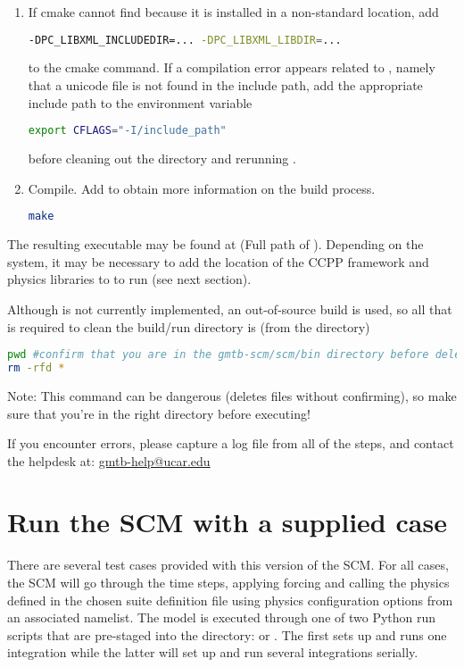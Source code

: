\begin{enumerate}
       \item If cmake cannot find  because it is installed in a non-standard location, add
\begin{lstlisting}[language=bash]
-DPC_LIBXML_INCLUDEDIR=... -DPC_LIBXML_LIBDIR=...
\end{lstlisting}
    to the cmake command. If a compilation error appears related to , namely that a unicode file is not found in the include path, add the appropriate include path to the  environment variable
\begin{lstlisting}[language=bash]
export CFLAGS="-I/include_path"
\end{lstlisting} before cleaning out the  directory and rerunning .
    \item Compile. Add  to obtain more information on the build process.
\begin{lstlisting}[language=bash]
make
\end{lstlisting}
\end{enumerate}

The resulting executable may be found at  (Full path of ). Depending on the system, it may be necessary to add the location of the CCPP framework and physics libraries to  to run  (see next section).

Although  is not currently implemented, an out-of-source build is used, so all that is required to clean the build/run directory is (from the  directory)
\begin{lstlisting}[language=bash]
pwd #confirm that you are in the gmtb-scm/scm/bin directory before deleting files
rm -rfd *
\end{lstlisting}
Note: This command can be dangerous (deletes files without confirming), so make sure that you're in the right directory before executing!

If you encounter errors, please capture a log file from all of the steps, and contact the helpdesk at: \url{gmtb-help@ucar.edu}

\section{Run the SCM with a supplied case}
There are several test cases provided with this version of the SCM. For all cases, the SCM will go through the time steps, applying forcing and calling the physics defined in the chosen suite definition file using physics configuration options from an associated namelist. The model is executed through one of two Python run scripts that are pre-staged into the  directory:  or . The first sets up and runs one integration while the latter will set up and run several integrations serially. 

